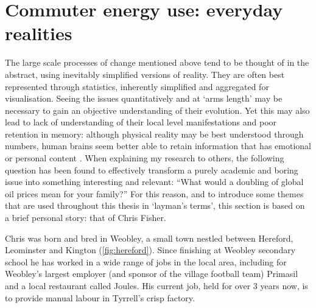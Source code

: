 
\section{Commuter energy use: everyday realities}
\label{s:realities}
The large scale processes of change mentioned above tend to be thought of in the
abstract, using inevitably simplified versions of reality. They are
often best represented through statistics, inherently simplified and
aggregated for visualisation. Seeing the issues quantitatively and
at `arms length' may be necessary to
gain an objective understanding of their evolution. Yet this may also lead to lack
of understanding of their local level manifestations and poor retention in memory:
although physical
reality may be best understood through numbers, human brains seem better able to
retain information that has emotional or personal content
\citep{Laird1982, Green2012}.
When explaining my research to others, the following question
has been found to
effectively transform a purely academic and boring issue into something
interesting and relevant:
``What would a doubling of global oil prices mean for your family?''
For this reason, and to introduce some themes that
are used throughout this thesis in `layman's terms', this section is
based on a brief personal story: that of Chris Fisher.

Chris was born and bred in Weobley, a small town nestled between Hereford,
Leominster and Kington (\cref{fig:hereford}). Since finishing
at Weobley secondary school he has worked in a
wide range of jobs in the local area, including for Weobley's largest employer
(and sponsor of the village football team) Primasil and a local restaurant
called Joules. His current job, held for over 3 years now, is
to provide manual labour in Tyrrell's crisp factory.

